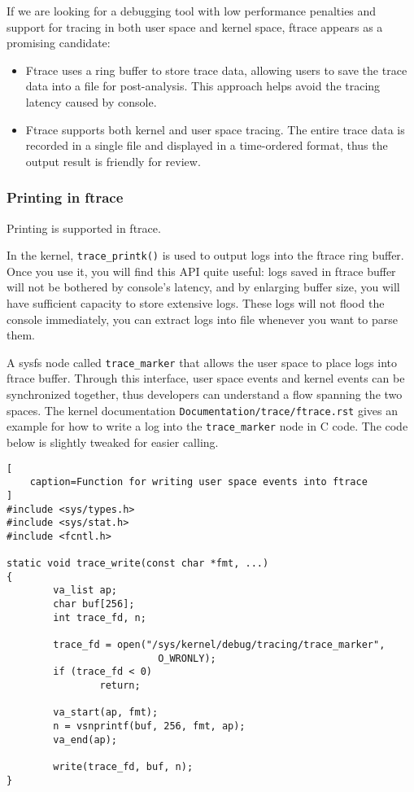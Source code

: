 \documentclass[11pt]{diazessay} %
\def\code#1{\texttt{#1}}
\begin{document}
If we are looking for a debugging tool with low performance penalties and
support for tracing in both user space and kernel space, ftrace appears as a
promising candidate:

\begin{itemize}
	\item Ftrace uses a ring buffer to store trace data, allowing users to save
the trace data into a file for post-analysis. This approach helps avoid
the tracing latency caused by console.
	\item Ftrace supports both kernel and user space tracing. The entire trace
data is recorded in a single file and displayed in a time-ordered format, thus
the output result is friendly for review.
\end{itemize}

\subsubsection*{Printing in ftrace}

Printing is supported in ftrace.

In the kernel, \code{trace\_printk()} is used to output logs into the ftrace
ring buffer. Once you use it, you will find this API quite useful: logs saved
in ftrace buffer will not be bothered by console's latency, and by
enlarging buffer size, you will have sufficient capacity to store extensive
logs. These logs will not flood the console immediately, you can extract logs
into file whenever you want to parse them.

A sysfs node called \code{trace\_marker} that allows the user space to place
logs into ftrace buffer. Through this interface, user space events and kernel
events can be synchronized together, thus developers can understand a flow
spanning the two spaces. The kernel documentation
\code{Documentation/trace/ftrace.rst} gives an example for how to write a log
into the \code{trace\_marker} node in C code. The code below is slightly
tweaked for easier calling.

\begin{lstlisting}[
	caption=Function for writing user space events into ftrace
]
#include <sys/types.h>
#include <sys/stat.h>
#include <fcntl.h>

static void trace_write(const char *fmt, ...)
{
        va_list ap;
        char buf[256];
        int trace_fd, n;

        trace_fd = open("/sys/kernel/debug/tracing/trace_marker",
                          O_WRONLY);
        if (trace_fd < 0)
                return;

        va_start(ap, fmt);
        n = vsnprintf(buf, 256, fmt, ap);
        va_end(ap);

        write(trace_fd, buf, n);
}
\end{lstlisting}
\end{document}
